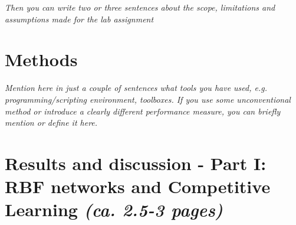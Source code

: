 \documentclass[a4paper]{article}
\begin{document}
\textit{Then you can write two or three sentences about the scope, limitations and assumptions made for the lab assignment}\\

\section{Methods}
\textit{Mention here in just a couple of sentences what tools you have used, e.g. programming/scripting environment, toolboxes. If you use some unconventional method or introduce a clearly different performance measure, you can briefly mention or define it here.}\\

\section{Results and discussion - Part I: RBF networks and Competitive Learning \normalsize{\textit{(ca. 2.5-3 pages)}}}
\end{document}

